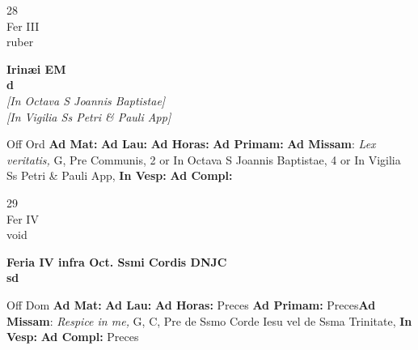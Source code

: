 \documentclass[10pt, openany]{book}
\begin{document}
    \begin{center}
        \begin{minipage}{3.5in}
            \vspace{2em}
            \begin{minipage}{0.5in}
                {\Huge 28} \\
                {\normalsize Fer III} \\
                {\normalsize ruber}
            \end{minipage}
            \begin{minipage}{3.0in}
                \textbf{ \large Irinæi EM \\
                \textnormal{\normalsize d}} \\ \textit{[In Octava S Joannis Baptistae]} \\ \textit{[In Vigilia Ss Petri \& Pauli App]} \\ 
            \end{minipage}
            \begin{justify}Off Ord
                \textbf{Ad Mat: }
                \textbf{Ad Lau: }
                \textbf{Ad Horas: }
                \textbf{Ad Primam: }\textbf{Ad Missam}: \textit{Lex veritatis,} G, Pre Communis, 2 or In Octava S Joannis Baptistae, 4 or In Vigilia Ss Petri \& Pauli App,  
                \textbf{In Vesp: }
                \textbf{Ad Compl: }
            \end{justify}
        \end{minipage}
    \end{center}

    \begin{center}
        \begin{minipage}{3.5in}
            \vspace{2em}
            \begin{minipage}{0.5in}
                {\Huge 29} \\
                {\normalsize Fer IV} \\
                {\normalsize void}
            \end{minipage}
            \begin{minipage}{3.0in}
                \textbf{ \large Feria IV infra Oct. Ssmi Cordis DNJC \\
                \textnormal{\normalsize sd}} \\ 
            \end{minipage}
            \begin{justify}Off Dom
                \textbf{Ad Mat: }
                \textbf{Ad Lau: }
                \textbf{Ad Horas: }Preces
                \textbf{Ad Primam: }Preces\textbf{Ad Missam}: \textit{Respice in me,} G, C, Pre de Ssmo Corde Iesu vel de Ssma Trinitate,  
                \textbf{In Vesp: }
                \textbf{Ad Compl: }Preces
            \end{justify}
        \end{minipage}
    \end{center}
\end{document}
